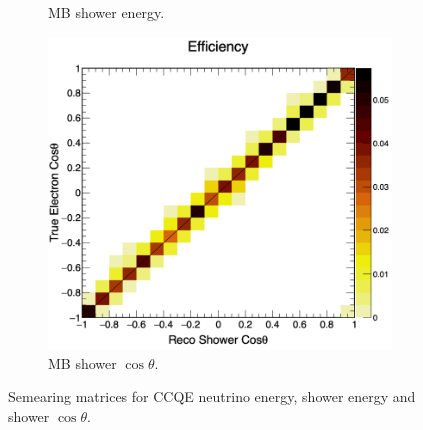 \begin{figure}[H]
\begin{subfigure}{0.49\linewidth}
        \caption{MB shower energy.}
    \end{subfigure}    
    \begin{subfigure}{0.49\linewidth}
        \includegraphics[width=\linewidth]{technote/SignalModel/Figures/ShwTheta_RecoTrue_Eff_2D.png}
        \caption{MB shower $\cos\theta$.}
    \end{subfigure}
    \caption{Semearing matrices for CCQE neutrino energy, shower energy and shower $\cos\theta$.}
    \label{fig:MB_response}
\end{figure}


